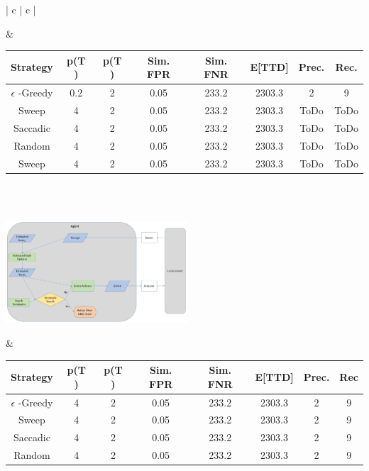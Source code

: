 \begin{landscape}
\begin{table}[h!]
\begin{tabular}{ | c | c | }
\begin{minipage}[c][40mm][c]{.45\textwidth}
    \end{minipage}
    &
    \small
    \begin{tabular}{c|c|c|c|c|c|c|c}
        Strategy & p(T \Romannum{1}) & p(T \Romannum{2}) & Sim. FPR & Sim. FNR & E[TTD] & Prec. & Rec. \\
        \hline
        $\epsilon$ -Greedy & 0.2 & 2 & 0.05 & 233.2 & 2303.3 & 2 & 9\\
        Sweep & 4 & 2 & 0.05 & 233.2 & 2303.3 & ToDo & ToDo\\
        Saccadic & 4 & 2 & 0.05 & 233.2 & 2303.3 & ToDo & ToDo\\
        Random & 4 & 2 & 0.05 & 233.2 & 2303.3 & ToDo & ToDo\\
        Sweep & 4 & 2 & 0.05 & 233.2 & 2303.3 & ToDo & ToDo\\
    \end{tabular}
    \normalsize
    \\
    \hline
    \\
    \hline
    \begin{minipage}[c][40mm][c]{.45\textwidth}
      \includegraphics[width=\linewidth, height=38mm]{Chapters/MultiAgentTargetDetection/Figs/AgentFnArchitecture/BasicAgentFunctionNoCommunication.PNG}

    \end{minipage}
    &
    \small
    \begin{tabular}{c|c|c|c|c|c|c|c}
        Strategy & p(T \Romannum{1}) & p(T \Romannum{2}) & Sim. FPR & Sim. FNR & E[TTD] & Prec. & Rec \\
        \hline
        $\epsilon$ -Greedy& 4 & 2 & 0.05 & 233.2 & 2303.3 & 2 & 9\\
        Sweep & 4 & 2 & 0.05 & 233.2 & 2303.3 & 2 & 9\\
        Saccadic & 4 & 2 & 0.05 & 233.2 & 2303.3 & 2 & 9\\
        Random & 4 & 2 & 0.05 & 233.2 & 2303.3 & 2 & 9\\


\end{tabular}
\end{tabular}
\end{table}
\end{landscape}
